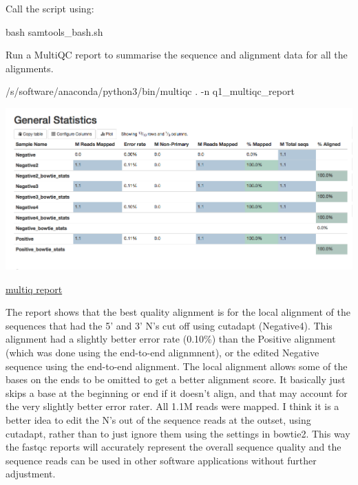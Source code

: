 \documentclass[]{article}
\newenvironment{Shaded}{\begin{snugshade}}{\end{snugshade}}
\newcommand{\FunctionTok}[1]{\textcolor[rgb]{0.00,0.00,0.00}{#1}}
\newcommand{\ExtensionTok}[1]{#1}
\newcommand{\NormalTok}[1]{#1}
\begin{document}
Call the script using:

\begin{Shaded}
\begin{Highlighting}[]
\FunctionTok{bash}\NormalTok{ samtools_bash.sh}
\end{Highlighting}
\end{Shaded}

Run a MultiQC report to summarise the sequence and alignment data for
all the alignments.

\begin{Shaded}
\begin{Highlighting}[]
\ExtensionTok{/s/software/anaconda/python3/bin/multiqc}\NormalTok{ . -n q1_multiqc_report}
\end{Highlighting}
\end{Shaded}

\includegraphics{MultiQCstats_Q1.png}

\href{/d/projects/u/sj003/results_cw1/q1_multiqc_report.html}{multiq
report}

The report shows that the best quality alignment is for the local
alignment of the sequences that had the 5' and 3' N's cut off using
cutadapt (Negative4). This alignment had a slightly better error rate
(0.10\%) than the Positive alignment (which was done using the
end-to-end alignmnent), or the edited Negative sequence using the
end-to-end alignment. The local alignment allows some of the bases on
the ends to be omitted to get a better alignment score. It basically
just skips a base at the beginning or end if it doesn't align, and that
may account for the very slightly better error rater. All 1.1M reads
were mapped. I think it is a better idea to edit the N's out of the
sequence reads at the outset, using cutadapt, rather than to just ignore
them using the settings in bowtie2. This way the fastqc reports will
accurately represent the overall sequence quality and the sequence reads
can be used in other software applications without further adjustment.
\end{document}
